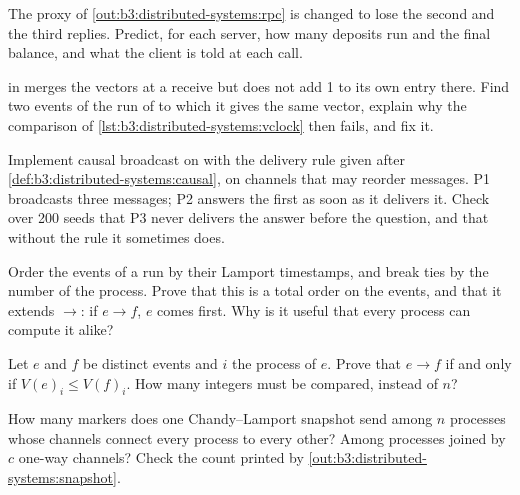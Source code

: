 \begin{exercise}[$\star$]\label{exo:b3:distributed-systems:4}
The proxy of \cref{out:b3:distributed-systems:rpc} is changed to lose the second and the third replies. Predict, for each server, how many deposits run and the final balance, and what the client is told at each call.
\end{exercise}

\begin{exercise}[$\star\star$]\label{exo:b3:distributed-systems:5}
 in  merges the vectors at a receive but does not add 1 to its own entry there. Find two events of the run of  to which it gives the same vector, explain why the comparison of \cref{lst:b3:distributed-systems:vclock} then fails, and fix it.
\end{exercise}

\begin{exercise}[$\star\star$]\label{exo:b3:distributed-systems:6}
Implement causal broadcast on  with the delivery rule given after \cref{def:b3:distributed-systems:causal}, on channels that may reorder messages. P1 broadcasts three messages; P2 answers the first as soon as it delivers it. Check over 200 seeds that P3 never delivers the answer before the question, and that without the rule it sometimes does.
\end{exercise}

\begin{exercise}[$\star\star$]\label{exo:b3:distributed-systems:7}
Order the events of a run by their Lamport timestamps, and break ties by the number of the process. Prove that this is a total order on the events, and that it extends $\to$: if $e \to f$, $e$ comes first. Why is it useful that every process can compute it alike?
\end{exercise}

\begin{exercise}[$\star\star$]\label{exo:b3:distributed-systems:8}
Let $e$ and $f$ be distinct events and $i$ the process of $e$. Prove that $e \to f$ if and only if $V(e)_i \le V(f)_i$. How many integers must be compared, instead of $n$?
\end{exercise}

\begin{exercise}[$\star\star$]\label{exo:b3:distributed-systems:9}
How many markers does one Chandy--Lamport snapshot send among $n$ processes whose channels connect every process to every other? Among processes joined by $c$ one-way channels? Check the count printed by \cref{out:b3:distributed-systems:snapshot}.
\end{exercise}

